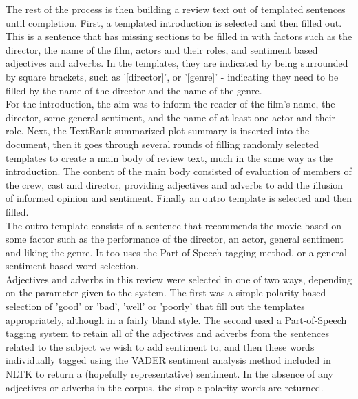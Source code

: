 The rest of the process is then building a review text out of templated sentences until completion.
First, a templated introduction is selected and then filled out. This is a sentence that has missing sections to be filled in with factors such as the director, the name of the film, actors and their roles, and sentiment based adjectives and adverbs. In the templates, they are indicated by being surrounded by square brackets, such as '[director]', or '[genre]' - indicating they need to be filled by the name of the director and the name of the genre.\\ 
For the introduction, the aim was to inform the reader of the film's name, the director, some general sentiment, and the name of at least one actor and their role. Next, the TextRank summarized plot summary is inserted into the document, then it goes through several rounds of filling randomly selected templates to create a main body of review text, much in the same way as the introduction. The content of the main body consisted of evaluation of members of the crew, cast and director, providing adjectives and adverbs to add the illusion of informed opinion and sentiment. Finally an outro template is selected and then filled. \\
The outro template consists of a sentence that recommends the movie based on some factor such as the performance of the director, an actor, general sentiment and liking the genre. It too uses the Part of Speech tagging method, or a general sentiment based word selection.\\
Adjectives and adverbs in this review were selected in one of two ways, depending on the parameter given to the system. The first was a simple polarity based selection of 'good' or 'bad', 'well' or 'poorly' that fill out the templates appropriately, although in a fairly bland style. The second used a Part-of-Speech tagging system to retain all of the adjectives and adverbs from the sentences related to the subject we wish to add sentiment to, and then these words individually tagged using the VADER sentiment analysis method included in NLTK to return a (hopefully representative) sentiment. In the absence of any adjectives or adverbs in the corpus, the simple polarity words are returned.

